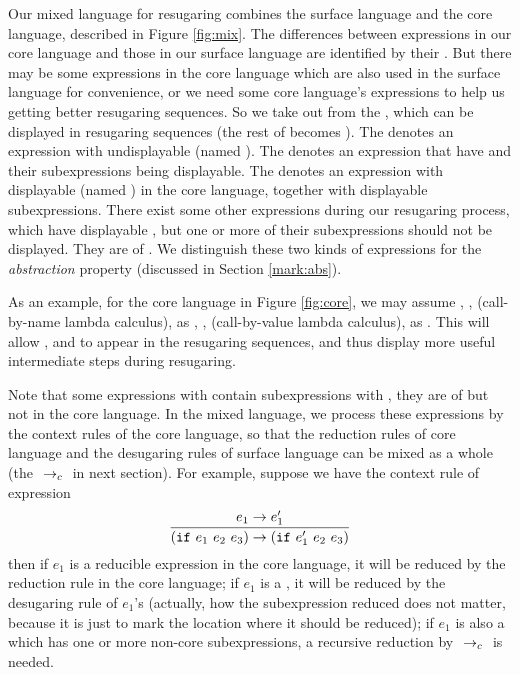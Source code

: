 Our mixed language for resugaring combines the surface language and the core language, described in Figure \ref{fig:mix}.
%
The differences between expressions in our core language and those in our surface language are identified by their . But there may be some expressions in the core language which are also used in the surface language for convenience, or we need some core language's expressions to help us getting better resugaring sequences. So we take  out from the , which can be displayed in resugaring sequences (the rest of  becomes ). The  denotes an expression with undisplayable  (named ). The  denotes an expression that have  and their subexpressions being displayable. The  denotes an expression with displayable  (named ) in the core language, together with displayable subexpressions. There exist some other expressions during our resugaring process, which have displayable , but one or more of their subexpressions should not be displayed. They are of . We distinguish these two kinds of expressions for the \emph{abstraction} property (discussed in Section \ref{mark:abs}).

As an example, for the core language in Figure \ref{fig:core},
we may assume , ,  (call-by-name lambda calculus),  as , ,  (call-by-value lambda calculus),  as . This will allow ,  and  to appear in the resugaring sequences, and thus display more useful intermediate steps during resugaring.

Note that some expressions with  contain subexpressions with , they are of  but not in the core language. In the mixed language, we process these expressions by the context rules of the core language, so that the reduction rules of core language and the desugaring rules of surface language can be mixed as a whole (the $~\rightarrow_c~$ in next section). For example, suppose we have the context rule of  expression
\[
\infer{(\m{if}~e_1~e_2~e_3) \rightarrow (\m{if}~e_1'~e_2~e_3)}{e_1 \rightarrow e_1'}
\]
then if $e_1$ is a reducible expression in the core language, it will be reduced by the reduction rule in the core language; if $e_1$ is a , it will be reduced by the desugaring rule of $e_1$'s  (actually, how the subexpression reduced does not matter, because it is just to mark the location where it should be reduced); if $e_1$ is also a  which has one or more non-core subexpressions, a recursive reduction by $~\rightarrow_c~$ is needed.


